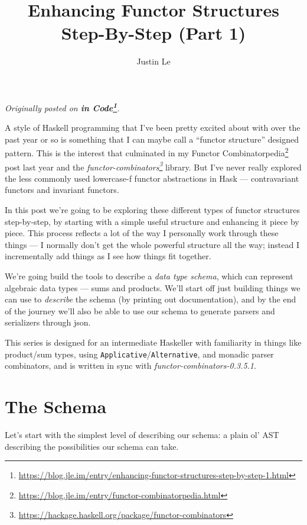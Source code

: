 \documentclass[]{article}
\title{Enhancing Functor Structures Step-By-Step (Part 1)}
\author{Justin Le}
\renewcommand{\href}[2]{#2\footnote{\url{#1}}}
\begin{document}
\maketitle

\emph{Originally posted on
\textbf{\href{https://blog.jle.im/entry/enhancing-functor-structures-step-by-step-1.html}{in
Code}}.}

A style of Haskell programming that I've been pretty excited about with over the
past year or so is something that I can maybe call a ``functor structure''
designed pattern. This is the interest that culminated in my
\href{https://blog.jle.im/entry/functor-combinatorpedia.html}{Functor
Combinatorpedia} post last year and the
\emph{\href{https://hackage.haskell.org/package/functor-combinators}{functor-combinators}}
library. But I've never really explored the less commonly used lowercase-f
functor abstractions in Hask --- contravariant functors and invariant functors.

In this post we're going to be exploring these different types of functor
structures step-by-step, by starting with a simple useful structure and
enhancing it piece by piece. This process reflects a lot of the way I personally
work through these things --- I normally don't get the whole powerful structure
all the way; instead I incrementally add things as I see how things fit
together.

We're going build the tools to describe a \emph{data type schema}, which can
represent algebraic data types --- sums and products. We'll start off just
building things we can use to \emph{describe} the schema (by printing out
documentation), and by the end of the journey we'll also be able to use our
schema to generate parsers and serializers through json.

This series is designed for an intermediate Haskeller with familiarity in things
like product/sum types, using \texttt{Applicative}/\texttt{Alternative}, and
monadic parser combinators, and is written in sync with
\emph{functor-combinators-0.3.5.1}.

\hypertarget{the-schema}{%
\section{The Schema}\label{the-schema}}

Let's start with the simplest level of describing our schema: a plain ol' AST
describing the possibilities our schema can take.
\end{document}
